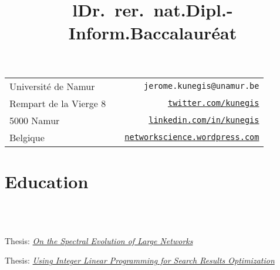 \documentclass[line,margin]{res}
\begin{document}
\begin{resume}

\vspace{0.5cm}

\hspace{-3cm}
\begin{tabular}{lcr}
  Université de Namur    &\hspace{6.3cm}\hfill& {\tt jerome.kunegis@unamur.be} \\
  Rempart de la Vierge 8 &                    & {\tt \href{http://twitter.com/kunegis}{twitter.com/kunegis}} \\
  5000 Namur             &                    & {\tt \href{http://www.linkedin.com/in/kunegis}{linkedin.com/in/kunegis}} \\
  Belgique               &                    & {\tt \href{http://networkscience.wordpress.com/}{networkscience.wordpress.com}} 
\end{tabular}
\vspace{1cm}

\section{Education}

\begin{format}
\title{l}\\
\\
\end{format}

\title{\bf Dr.\ rer.\ nat.}
\begin{position}
Thesis:
\emph{\href{http://userpages.uni-koblenz.de/~kunegis/paper/kunegis-phd-thesis-on-the-spectral-evolution-of-large-networks.pdf}{On
    the Spectral Evolution of Large Networks}}  
\end{position}

\title{\bf Dipl.-Inform.}
\begin{position}
Thesis: \emph{\href{http://userpages.uni-koblenz.de/~kunegis/paper/kunegis-diploma-thesis-using-integer-linear-programming-for-search-results-optimization.pdf}{Using Integer Linear Programming for Search Results Optimization}}
\end{position}

\title{\bf Baccalauréat}
\begin{position}
\end{position}


\end{resume}
\end{document}
